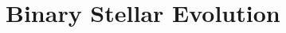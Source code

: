\documentclass[twocolumn, twocolappendix, oneside]{aastex631}
\newcommand{\paraOutlineHdr}[1]{{\color{gray}[\textit{#1}]}}
\newcommand{\gmode}{$g$-mode\xspace}
\newcommand{\mesa}{\texttt{MESA}\xspace}
\begin{document}




\section{Binary Stellar Evolution} \label{sec:methods}
\end{document}
